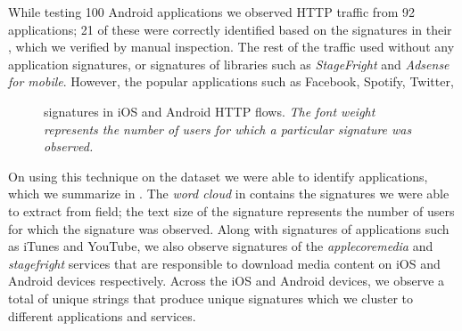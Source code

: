 While testing 100 Android applications we observed HTTP traffic from 92 applications; 21 of these were correctly identified based on the signatures in their \useragent, which we verified by manual inspection.
The rest of the traffic used \useragent without any application signatures, or signatures of libraries such as \emph{StageFright} and \emph{Adsense for mobile}. 
However, the popular applications such as Facebook, Spotify, Twitter, 





\begin{figure}
\newline
{}
\caption{\useragent signatures in  iOS and Android HTTP flows. \emph{The font weight represents the number of users for which a particular signature was observed.}}
\label{fig:http-wordcloud}
\end{figure}

On using this technique on the \mobWild dataset we were able to identify \tbd{} applications, which we summarize in .
The \emph{word cloud} in  contains the signatures we were able to extract from \useragent field; the text size of the signature represents the number of users for which the signature was observed.
Along with signatures of applications such as iTunes and YouTube, we also observe signatures of the \emph{applecoremedia} and \emph{stagefright} services that are responsible to download media content on iOS and Android devices respectively.
Across the iOS and Android devices, we observe a total of  unique \useragent strings that produce  unique signatures which we cluster to \tbd{} different applications and services. 


